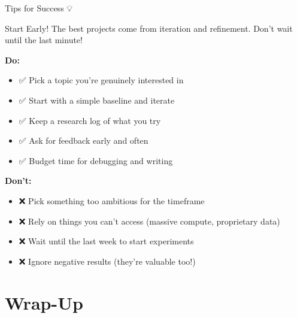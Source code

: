 \documentclass[aspectratio=169]{beamer}
\begin{document}
\begin{frame}[shrink=10]{Tips for Success 💡}
\begin{alertblock}{Start Early!}
The best projects come from iteration and refinement. Don't wait until the last minute!
\end{alertblock}

\vspace{0.5em}

\textbf{Do:}
\begin{itemize}\setlength{\itemsep}{0pt}
    \item ✅ Pick a topic you're genuinely interested in
    \item ✅ Start with a simple baseline and iterate
    \item ✅ Keep a research log of what you try
    \item ✅ Ask for feedback early and often
    \item ✅ Budget time for debugging and writing
\end{itemize}

\vspace{0.5em}

\textbf{Don't:}
\begin{itemize}\setlength{\itemsep}{0pt}
    \item ❌ Pick something too ambitious for the timeframe
    \item ❌ Rely on things you can't access (massive compute, proprietary data)
    \item ❌ Wait until the last week to start experiments
    \item ❌ Ignore negative results (they're valuable too!)
\end{itemize}
\end{frame}

\section{Wrap-Up}
\end{document}
